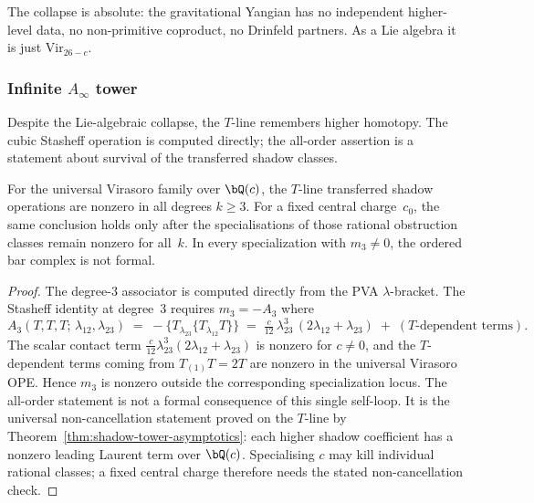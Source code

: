 The collapse is absolute: the gravitational Yangian has no independent
higher-level data, no non-primitive coproduct, no Drinfeld
partners. As a Lie algebra it is just $\mathrm{Vir}_{26-c}$.

\subsubsection*{Infinite $A_\infty$ tower}

Despite the Lie-algebraic collapse, the $T$-line remembers higher
homotopy. The cubic Stasheff operation is computed directly; the
all-order assertion is a statement about survival of the transferred
shadow classes.

\begin{theorem}
\label{thm:vir-non-formality}
For the universal Virasoro family over $\bQ(c)$, the $T$-line
transferred shadow operations are nonzero in all degrees
$k\ge3$. For a fixed central charge~$c_0$, the same conclusion holds
only after the specialisations of those rational obstruction classes
remain nonzero for all~$k$. In every specialization with
$m_3\neq0$, the ordered bar complex is not formal.
\end{theorem}

\begin{proof}
The degree-$3$ associator is computed directly from the PVA
$\lambda$-bracket. The Stasheff identity at degree~$3$ requires
$m_3 = -A_3$ where
\[
A_3(T,T,T;\,\lambda_{12},\lambda_{23})
\;=\;
-\{T{}_{\lambda_{23}}\{T{}_{\lambda_{12}} T\}\}
\;=\;
\tfrac{c}{12}\,\lambda_{23}^3\,(2\lambda_{12} + \lambda_{23})
\;+\;(\text{$T$-dependent terms}).
\]
The scalar contact term $\frac{c}{12}\lambda_{23}^3(2\lambda_{12}
+ \lambda_{23})$ is nonzero for $c \neq 0$, and the $T$-dependent
terms coming from $T_{(1)}T=2T$ are nonzero in the universal Virasoro
OPE. Hence $m_3$ is nonzero outside the corresponding specialization
locus. The all-order statement is not a formal consequence of this
single self-loop. It is the universal non-cancellation statement proved
on the $T$-line by Theorem~\ref{thm:shadow-tower-asymptotics}: each
higher shadow coefficient has a nonzero leading Laurent term over
$\bQ(c)$. Specialising $c$ may kill individual rational classes; a
fixed central charge therefore needs the stated non-cancellation check.
\end{proof}

